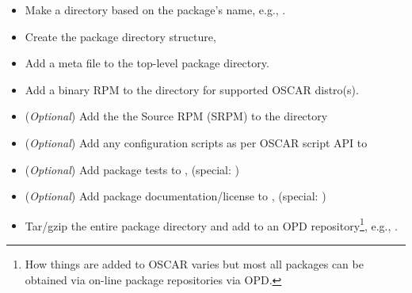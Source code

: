 \begin{itemize}
	\item Make a directory based on the package's name, e.g., .

	\item Create the package directory structure,

	\item Add a  meta file to the top-level package directory.

	\item Add a binary RPM to the  directory for 
	      supported OSCAR distro(s).

	\item (\emph{Optional}) Add the the Source RPM (SRPM) to the
	       directory

	\item (\emph{Optional}) Add any configuration scripts as per OSCAR
	      script API to 

	\item (\emph{Optional}) Add package tests to
	, (special: )

	\item (\emph{Optional}) Add package documentation/license to
	, (special: )

	\item Tar/gzip the entire package directory and add to an OPD
		repository\footnote{How things are added to OSCAR varies but most all
		packages can be obtained via on-line package repositories via
		OPD.}, e.g., .
\end{itemize}

